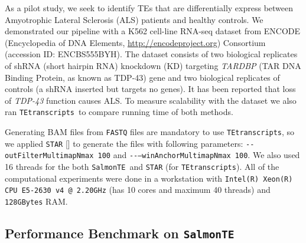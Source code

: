 \documentclass[wsdraft]{ws-procs11x85}
\newcommand{\TEtranscripts}{\texttt{TEtranscripts}}
\newcommand{\SalmonTE}{\texttt{SalmonTE}}
\begin{document}
As a pilot study, we seek to identify TEs that are  differentially express between Amyotrophic Lateral Sclerosis (ALS) patients and healthy  controls.
We demonstrated our pipeline with a K562 cell-line RNA-seq dataset from ENCODE (Encyclopedia of DNA Elements, \url{http://encodeproject.org})  Consortium (accession ID: ENCBS555BYH).\cite{encode2012integrated}
The dataset consists of two biological replicates of shRNA (short hairpin RNA) knockdown (KD)
% 
% 
% 
%
targeting \textit{TARDBP} (TAR DNA Binding Protein, as known as TDP-43) gene and two biological replicates of controls 
(a shRNA inserted but targets no genes). 
It has been reported that loss of \textit{TDP-43} function causes 
ALS.\cite{yang2014partial,mihevc2016tdp} To measure scalability with the dataset
we also ran \TEtranscripts~to compare running time of both methods.


Generating BAM files from \verb|FASTQ| files are mandatory to use \TEtranscripts, so we applied \verb|STAR| [] to generate the files with following parameters:
% 
% 
% 
%
\verb|--outFilterMultimapNmax 100| and \verb|--–winAnchorMultimapNmax 100|. We also used 16 threads for the both \SalmonTE~and \verb|STAR| (for \TEtranscripts).
All of the computational experiments were done in a workstation with 
\verb|Intel(R) Xeon(R) CPU E5-2630 v4 @ 2.20GHz| (has 10 cores and maximum 40 threads) and \verb|128GBytes| RAM.


\subsection{Performance Benchmark on \SalmonTE}
\end{document}
